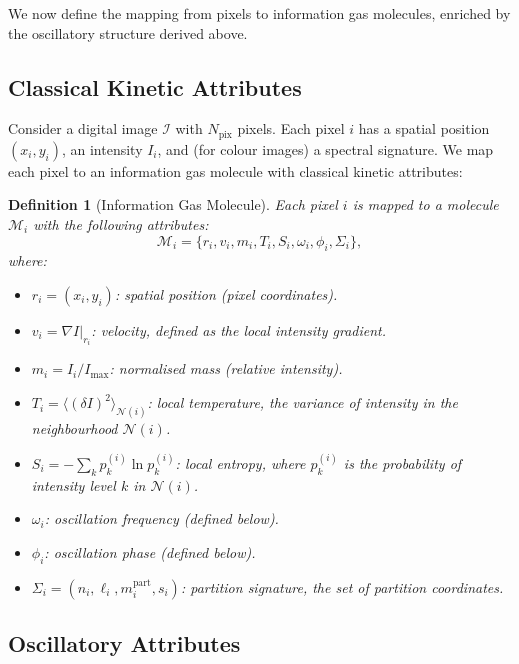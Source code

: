 \documentclass[11pt,twocolumn,a4paper]{article}
\newtheorem{definition}[theorem]{Definition}
\begin{document}
We now define the mapping from pixels to information gas molecules, enriched by the oscillatory structure derived above.

\subsection{Classical Kinetic Attributes}

Consider a digital image $\mathcal{I}$ with $N_{\text{pix}}$ pixels. Each pixel $i$ has a spatial position $(x_i, y_i)$, an intensity $I_i$, and (for colour images) a spectral signature. We map each pixel to an information gas molecule with classical kinetic attributes:

\begin{definition}[Information Gas Molecule]\label{def:info_gas}
Each pixel $i$ is mapped to a molecule $\mathcal{M}_i$ with the following attributes:
\begin{equation}
    \mathcal{M}_i = \{r_i, v_i, m_i, T_i, S_i, \omega_i, \phi_i, \Sigma_i\},
    \label{eq:molecule}
\end{equation}
where:
\begin{itemize}[leftmargin=2em]
    \item $r_i = (x_i, y_i)$: spatial position (pixel coordinates).
    \item $v_i = \nabla I|_{r_i}$: velocity, defined as the local intensity gradient.
    \item $m_i = I_i / I_{\max}$: normalised mass (relative intensity).
    \item $T_i = \langle (\delta I)^2 \rangle_{\mathcal{N}(i)}$: local temperature, the variance of intensity in the neighbourhood $\mathcal{N}(i)$.
    \item $S_i = -\sum_k p_k^{(i)} \ln p_k^{(i)}$: local entropy, where $p_k^{(i)}$ is the probability of intensity level $k$ in $\mathcal{N}(i)$.
    \item $\omega_i$: oscillation frequency (defined below).
    \item $\phi_i$: oscillation phase (defined below).
    \item $\Sigma_i = (n_i, \ell_i, m_i^{\text{part}}, s_i)$: partition signature, the set of partition coordinates.
\end{itemize}
\end{definition}

\subsection{Oscillatory Attributes}
\end{document}
